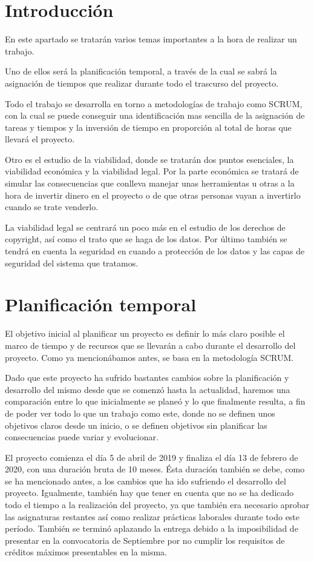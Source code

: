 
\section{Introducción}

En este apartado se tratarán varios temas importantes a la hora de realizar un trabajo. 

Uno de ellos será la planificación temporal, a través de la cual se sabrá la asignación de tiempos que realizar durante todo el trascurso del proyecto.

Todo el trabajo se desarrolla en torno a metodologías de trabajo como SCRUM, con la cual se puede conseguir una identificación mas sencilla de la asignación de tareas y tiempos y la inversión de tiempo en proporción al total de horas que llevará el proyecto.

Otro es el estudio de la viabilidad, donde se tratarán dos puntos esenciales, la viabilidad económica y la viabilidad legal. Por la parte económica se tratará de simular las consecuencias que conlleva manejar unas herramientas u otras a la hora de invertir dinero en el proyecto o de que otras personas vayan a invertirlo cuando se trate venderlo.

La viabilidad legal se centrará un poco más en el estudio de los derechos de copyright, así como el trato que se haga de los datos. Por último también se tendrá en cuenta la seguridad en cuando a protección de los datos y las capas de seguridad del sistema que tratamos.

\section{Planificación temporal}

El objetivo inicial al planificar un proyecto es definir lo más claro posible el marco de tiempo y de recursos que se llevarán a cabo durante el desarrollo del proyecto. Como ya mencionábamos antes, se basa en la metodología SCRUM.

Dado que este proyecto ha sufrido bastantes cambios sobre la planificación y desarrollo del mismo desde que se comenzó hasta la actualidad, haremos una comparación entre lo que inicialmente se planeó y lo que finalmente resulta, a fin de poder ver todo lo que un trabajo como este, donde no se definen unos objetivos claros desde un inicio, o se definen objetivos sin planificar las consecuencias puede variar y evolucionar.

El proyecto comienza el día 5 de abril de 2019 y finaliza el día 13 de febrero de 2020, con una duración bruta de 10 meses. Ésta duración también se debe, como se ha mencionado antes, a los cambios que ha ido sufriendo el desarrollo del proyecto. Igualmente, también hay que tener en cuenta que no se ha dedicado todo el tiempo a la realización del proyecto, ya que también era necesario aprobar las asignaturas restantes así como realizar prácticas laborales durante todo este período. También se terminó aplazando la entrega debido a la imposibilidad de presentar en la convocatoria de Septiembre por no cumplir los requisitos de créditos máximos presentables en la misma.

